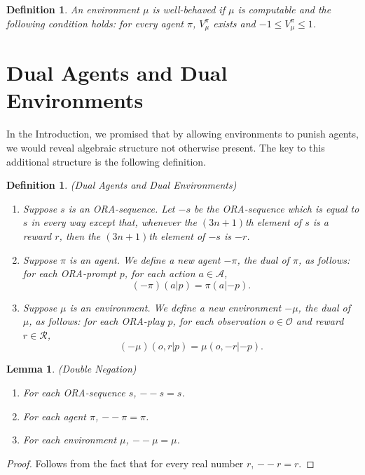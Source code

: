 \documentclass{article}
\newtheorem{definition}[theorem]{Definition}
\newtheorem{lemma}[theorem]{Lemma}
\begin{document}
\begin{definition}
    An environment $\mu$ is \emph{well-behaved} if $\mu$ is computable and the following
    condition holds: for every agent $\pi$, $V^\pi_\mu$ exists and
    $-1\leq V^\pi_\mu\leq 1$.
\end{definition}

\section{Dual Agents and Dual Environments}
\label{dualsection}

In the Introduction, we promised that by allowing environments to punish agents,
we would reveal algebraic structure not otherwise present. The key to this additional
structure is the following definition.

\begin{definition}
(Dual Agents and Dual Environments)
\begin{enumerate}
    \item
    Suppose $s$ is an ORA-sequence. Let $-s$
    be the ORA-sequence which is equal to $s$ in every way except that,
    whenever the $(3n+1)$th element of $s$ is a reward $r$,
    then the $(3n+1)$th element of $-s$ is $-r$.
    \item
    Suppose $\pi$ is an agent.
    We define a new agent $-\pi$, the \emph{dual} of $\pi$,
    as follows:
    for each ORA-prompt $p$, for each action $a\in\mathcal A$,
    \[(-\pi)(a|p)=\pi(a|{-p}).\]
    \item
    Suppose $\mu$ is an environment.
    We define a new environment $-\mu$, the \emph{dual} of $\mu$,
    as follows:
    for each ORA-play $p$, for each observation $o\in\mathcal O$
    and reward $r\in\mathcal R$,
    \[(-\mu)(o,r|p)=\mu(o,-r|{-p}).\]
\end{enumerate}
\end{definition}

\begin{lemma}
\label{doublesubtractionlemma}
(Double Negation)
    \begin{enumerate}
        \item For each ORA-sequence $s$, $--s=s$.
        \item For each agent $\pi$, $--\pi=\pi$.
        \item For each environment $\mu$, $--\mu=\mu$.
    \end{enumerate}
\end{lemma}

\begin{proof}
    Follows from the fact that for every real number $r$, $--r=r$.
\end{proof}
\end{document}
